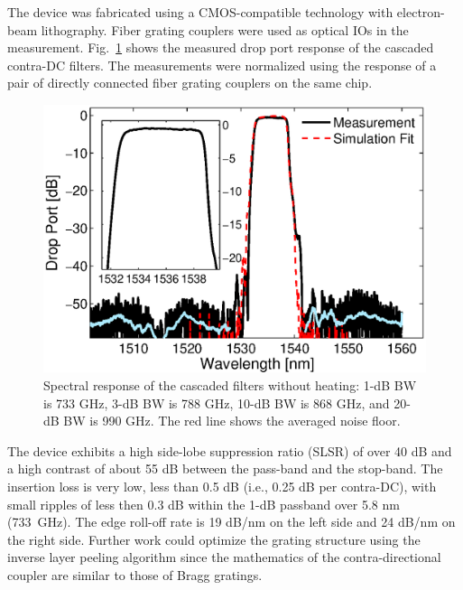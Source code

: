 \documentclass[osajnl,twocolumn,showpacs,superscriptaddress,10pt]{revtex4-1}
\begin{document}

The device was fabricated using a CMOS-compatible technology with electron-beam lithography. 
Fiber grating couplers were used as optical IOs in the measurement. 
Fig.~\ref{fig:passive} shows the measured drop port response of the cascaded contra-DC filters. 
The measurements were normalized using the response of a pair of directly connected fiber grating couplers on the same chip.
\begin{figure}[htbp]
\centering
\includegraphics[width=.99\columnwidth]{data/Passive5NormNoSimu}
\caption{ Spectral response of the cascaded filters without heating: 1-dB BW is 733 GHz, 3-dB BW is 788 GHz, 10-dB BW is 868 GHz, and 20-dB BW is 990 GHz. The red line shows the averaged noise floor.}
\label{fig:passive}
\end{figure}

The device exhibits a high side-lobe suppression ratio (SLSR) of over 40 dB and a high contrast of about 55 dB between the pass-band and the stop-band. 
The insertion loss is very low, less than 0.5 dB (i.e., 0.25 dB per contra-DC), with small ripples of less then 0.3 dB within the 1-dB passband over 5.8 nm (733~GHz). 
The edge roll-off rate is 19 dB/nm on the left side and 24 dB/nm on the right side.
Further work could optimize the grating structure using the inverse layer peeling algorithm\cite{skaar2001synthesis} since the mathematics of the contra-directional coupler are similar to those of Bragg gratings.
\end{document}
